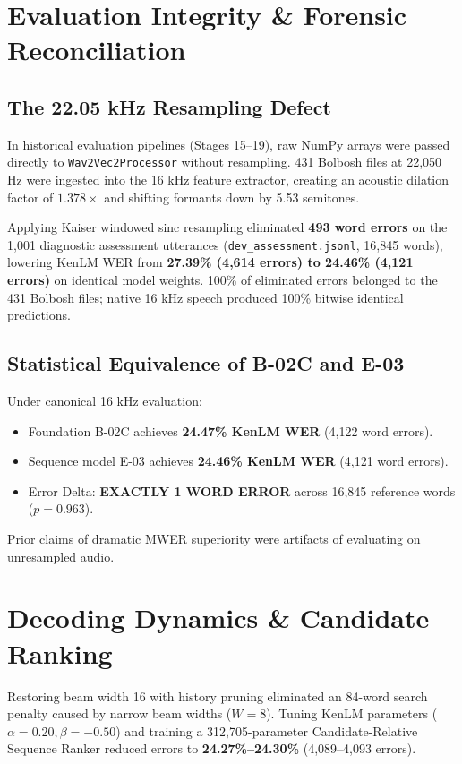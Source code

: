 \documentclass[11pt,a4paper]{article}
\begin{document}
\section{Evaluation Integrity \& Forensic Reconciliation}
\subsection{The 22.05 kHz Resampling Defect}
In historical evaluation pipelines (Stages 15--19), raw NumPy arrays were passed directly to \texttt{Wav2Vec2Processor} without resampling. 431 Bolbosh files at 22,050 Hz were ingested into the 16 kHz feature extractor, creating an acoustic dilation factor of $1.378\times$ and shifting formants down by 5.53 semitones. 

Applying Kaiser windowed sinc resampling eliminated \textbf{493 word errors} on the 1,001 diagnostic assessment utterances (\texttt{dev\_assessment.jsonl}, 16,845 words), lowering KenLM WER from \textbf{27.39\% (4,614 errors) to 24.46\% (4,121 errors)} on identical model weights. 100\% of eliminated errors belonged to the 431 Bolbosh files; native 16 kHz speech produced 100\% bitwise identical predictions.

\subsection{Statistical Equivalence of B-02C and E-03}
Under canonical 16 kHz evaluation:
\begin{itemize}
    \item Foundation B-02C achieves \textbf{24.47\% KenLM WER} (4,122 word errors).
    \item Sequence model E-03 achieves \textbf{24.46\% KenLM WER} (4,121 word errors).
    \item Error Delta: \textbf{EXACTLY 1 WORD ERROR} across 16,845 reference words ($p = 0.963$).
\end{itemize}
Prior claims of dramatic MWER superiority were artifacts of evaluating on unresampled audio.

\section{Decoding Dynamics \& Candidate Ranking}
Restoring beam width 16 with history pruning eliminated an 84-word search penalty caused by narrow beam widths ($W=8$). Tuning KenLM parameters ($\alpha=0.20, \beta=-0.50$) and training a 312,705-parameter Candidate-Relative Sequence Ranker reduced errors to \textbf{24.27\%--24.30\%} (4,089--4,093 errors).
\end{document}
